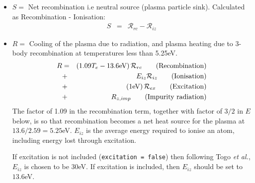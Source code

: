 \documentclass[12pt,a4paper]{article}
\begin{document}
\begin{itemize}
\item $S = $ Net recombination i.e neutral source (plasma particle sink). Calculated as Recombination - Ionisation:
\begin{eqnarray*}
  S &=& \mathcal{R}_{rc} - \mathcal{R}_{iz}
\end{eqnarray*}
\item $R = $ Cooling of the plasma due to radiation, and plasma heating due to 3-body recombination at temperatures less than 5.25eV.
  \begin{eqnarray*}
    R &=& \left(1.09 T_e - 13.6\textrm{eV}\right)\mathcal{R}_{rc} \qquad \mbox{\textrm{(Recombination)}}\\
    &+& E_{iz}\mathcal{R}_{iz}  \qquad \mbox{\textrm{(Ionisation)}} \\
    &+& \left(1\textrm{eV}\right)\mathcal{R}_{ex} \qquad \mbox{\textrm{(Excitation)}} \\
    &+& R_{z,imp} \qquad \mbox{\textrm{(Impurity radiation)}}
  \end{eqnarray*}
  The factor of 1.09 in the recombination term, together with factor of $3/2$ in $E$ below, is so that recombination becomes a net heat source for the plasma at $13.6 / 2.59 = 5.25$eV. $E_{iz}$ is the average energy required to ionise an atom, including
  energy lost through excitation.

  If excitation is not included (\texttt{excitation = false}) then following Togo {\it et al.}, $E_{iz}$ is chosen to be 30eV. If excitation is included, then $E_{iz}$ should be set to $13.6$eV.
  

\end{itemize}
\end{document}
